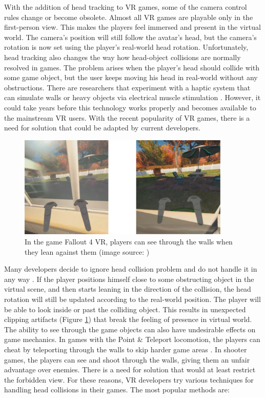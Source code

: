 With the addition of head tracking to VR games, some of the camera control rules change or become obsolete. Almost all VR games are playable only in the first-person view. This makes the players feel immersed and present in the virtual world. The camera's position will still follow the avatar's head, but the camera's rotation is now set using the player’s real-world head rotation. Unfortunately, head tracking also changes the way how head-object collisions are normally resolved in games. The problem arises when the player's head should collide with some game object, but the user keeps moving his head in real-world without any obstructions. There are researchers that experiment with a haptic system that can simulate walls or heavy objects via electrical muscle stimulation \cite{HEPTICSYSTEM}. However, it could take years before this technology works properly and becomes available to the mainstream VR users. With the recent popularity of VR games, there is a need for solution that could be adapted by current developers.

\begin{figure}[th]
\centering
\includegraphics[width=0.9\textwidth]{img/clipping.png}
\caption{In the game Fallout 4 VR, players can see through the walls when they lean against them (image source: \cite{redditfallout})}
\label{fig:FALLOUTCLIPPING}
\end{figure}

Many developers decide to ignore head collision problem and do not handle it in any way \cite{OCULUSDOCCLIPPING}. If the player positions himself close to some obstructing object in the virtual scene, and then starts leaning in the direction of the collision, the head rotation will still be updated according to the real-world position. The player will be able to look inside or past the colliding object. This results in unexpected clipping artifacts (Figure \ref{fig:FALLOUTCLIPPING}) that break the feeling of presence in virtual world. The ability to see through the game objects can also have undesirable effects on game mechanics. In games with the Point \& Teleport locomotion, the players can cheat by teleporting through the walls to skip harder game areas \cite{SKYRIMTELEPORT}. In shooter games, the players can see and shoot through the walls, giving them an unfair advantage over enemies. There is a need for solution that would at least restrict the forbidden view. For these reasons, VR developers try various techniques for handling head collisions in their games. The most popular methods are:

